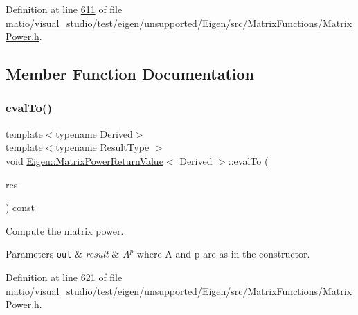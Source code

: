 Definition at line \hyperlink{matio_2visual__studio_2test_2eigen_2unsupported_2_eigen_2src_2_matrix_functions_2_matrix_power_8h_source_l00611}{611} of file \hyperlink{matio_2visual__studio_2test_2eigen_2unsupported_2_eigen_2src_2_matrix_functions_2_matrix_power_8h_source}{matio/visual\+\_\+studio/test/eigen/unsupported/\+Eigen/src/\+Matrix\+Functions/\+Matrix\+Power.\+h}.



\subsection{Member Function Documentation}
\mbox{\label{class_eigen_1_1_matrix_power_return_value_acdef58da9a4bcd2ec70260e73ce31973}} 
\subsubsection{\texorpdfstring{eval\+To()}{evalTo()}\hspace{0.1cm}{\footnotesize\ttfamily [1/2]}}
{\footnotesize\ttfamily template$<$typename Derived$>$ \\
template$<$typename Result\+Type $>$ \\
void \hyperlink{class_eigen_1_1_matrix_power_return_value}{Eigen\+::\+Matrix\+Power\+Return\+Value}$<$ Derived $>$\+::eval\+To (\begin{DoxyParamCaption}\item[{Result\+Type \&}]{res }\end{DoxyParamCaption}) const\hspace{0.3cm}{\ttfamily [inline]}}



Compute the matrix power. 


\begin{DoxyParams}[1]{Parameters}
\mbox{\tt out}  & {\em result} & $ A^p $ where {\ttfamily A} and {\ttfamily p} are as in the constructor. \\
\hline
\end{DoxyParams}


Definition at line \hyperlink{matio_2visual__studio_2test_2eigen_2unsupported_2_eigen_2src_2_matrix_functions_2_matrix_power_8h_source_l00621}{621} of file \hyperlink{matio_2visual__studio_2test_2eigen_2unsupported_2_eigen_2src_2_matrix_functions_2_matrix_power_8h_source}{matio/visual\+\_\+studio/test/eigen/unsupported/\+Eigen/src/\+Matrix\+Functions/\+Matrix\+Power.\+h}.

